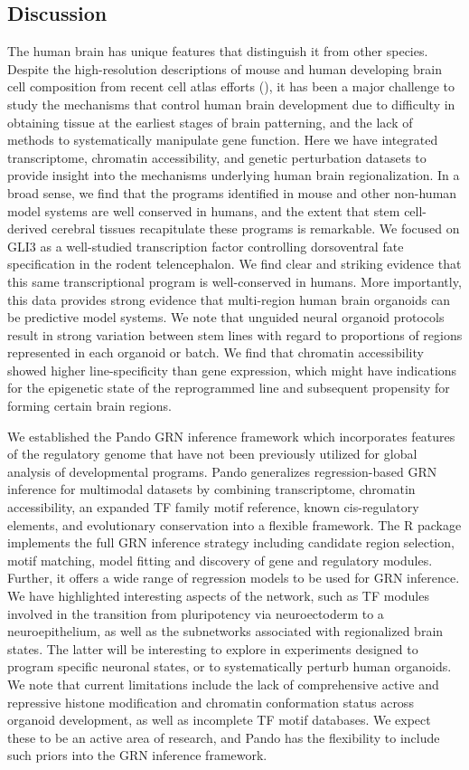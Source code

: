 \subsection{Discussion}
The human brain has unique features that distinguish it from other species. Despite the high-resolution descriptions of mouse and human developing brain cell composition from recent cell atlas efforts (\cite{nowakowski_spatiotemporal_2017,trevino_chromatin_2020,la_manno_molecular_2021}), it has been a major challenge to study the mechanisms that control human brain development due to difficulty in obtaining tissue at the earliest stages of brain patterning, and the lack of methods to systematically manipulate gene function. Here we have integrated transcriptome, chromatin accessibility, and genetic perturbation datasets to provide insight into the mechanisms underlying human brain regionalization. In a broad sense, we find that the programs identified in mouse and other non-human model systems are well conserved in humans, and the extent that stem cell-derived cerebral tissues recapitulate these programs is remarkable. We focused on GLI3 as a well-studied transcription factor controlling dorsoventral fate specification in the rodent telencephalon. We find clear and striking evidence that this same transcriptional program is well-conserved in humans. More importantly, this data provides strong evidence that multi-region human brain organoids can be predictive model systems. We note that unguided neural organoid protocols result in strong variation between stem lines with regard to proportions of regions represented in each organoid or batch. We find that chromatin accessibility showed higher line-specificity than gene expression, which might have indications for the epigenetic state of the reprogrammed line and subsequent propensity for forming certain brain regions.

We established the Pando GRN inference framework which incorporates features of the regulatory genome that have not been previously utilized for global analysis of developmental programs. Pando generalizes regression-based GRN inference for multimodal datasets by combining transcriptome, chromatin accessibility, an expanded TF family motif reference, known cis-regulatory elements, and evolutionary conservation into a flexible framework. The R package implements the full GRN inference strategy including candidate region selection, motif matching, model fitting and discovery of gene and regulatory modules. Further, it offers a wide range of regression models to be used for GRN inference. We have highlighted interesting aspects of the network, such as TF modules involved in the transition from pluripotency via neuroectoderm to a neuroepithelium, as well as the subnetworks associated with regionalized brain states. The latter will be interesting to explore in experiments designed to program specific neuronal states, or to systematically perturb human organoids. We note that current limitations include the lack of comprehensive active and repressive histone modification and chromatin conformation status across organoid development, as well as incomplete TF motif databases. We expect these to be an active area of research, and Pando has the flexibility to include such priors into the GRN inference framework.

